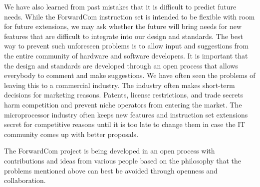 \documentclass[forwardcom.tex]{subfiles}
\begin{document}
We have also learned from past mistakes that it is difficult to predict future needs. While the ForwardCom instruction set is intended to be flexible with room for future extensions, we may ask whether the future will bring needs for new features that are difficult to integrate into our design and standards. The best way to prevent such unforeseen problems is to allow input and suggestions from the entire community of hardware and software developers. It is important that the design and standards are developed through an open process that allows everybody to comment and make suggestions. We have often seen the problems of leaving this to a commercial industry. The industry often makes short-term decisions for marketing reasons. Patents, license restrictions, and trade secrets harm competition and prevent niche operators from entering the market. The microprocessor industry often keeps new features and instruction set extensions secret for competitive reasons until it is too late to change them in case the IT community comes up with better proposals.
\vv

The ForwardCom project is being developed in an open process with contributions and ideas from various people based on the philosophy that the problems mentioned above can best be avoided through openness and collaboration.
\end{document}
